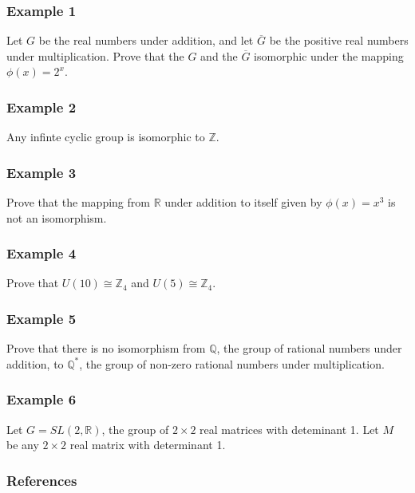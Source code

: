 \documentclass{beamer}
\begin{document}
\begin{frame}
    \frametitle{Example 1}

    Let \(G\) be the real numbers under addition, and let \(\overline{G}\) be the positive real numbers under multiplication. Prove that the \(G\) and the \(\overline{G}\) isomorphic under the mapping \(\phi(x)=2^x\). 

\end{frame}

\begin{frame}
    \frametitle{Example 2}

    Any infinte cyclic group is isomorphic to \(\mathbb{Z}\). 

\end{frame}

\begin{frame}
    \frametitle{Example 3}

    Prove that the mapping from \(\mathbb{R}\) under addition to itself given by \(\phi(x)=x^3\) is not an isomorphism.

\end{frame}

\begin{frame}
    \frametitle{Example 4}

    Prove that \(U(10) \cong \mathbb{Z}_4\) and \(U(5)\cong \mathbb{Z}_4\). 

\end{frame}

\begin{frame}
    \frametitle{Example 5}

    Prove that there is no isomorphism from \(\mathbb{Q}\), the group of rational numbers under addition, to \(\mathbb{Q}^*\), the group of non-zero rational numbers under multiplication. 

\end{frame}

\begin{frame}
    \frametitle{Example 6}

    Let \(G=SL(2, \mathbb{R})\), the group of \(2 \times 2\) real matrices with deteminant 1. Let \(M\) be any \(2 \times 2\) real matrix with determinant 1.  

\end{frame}


\begin{frame}
    \frametitle{References}
\end{frame}
\end{document}
